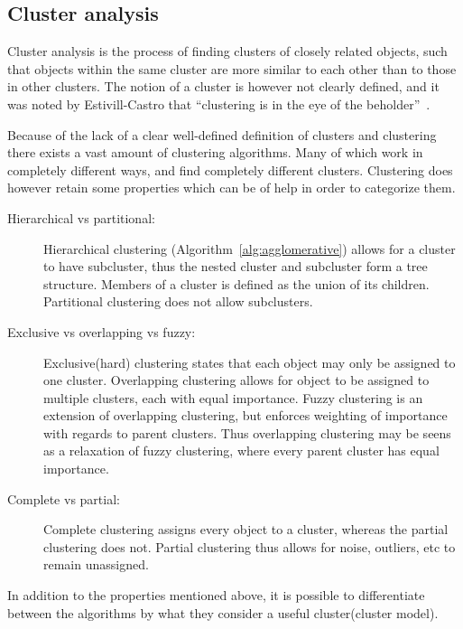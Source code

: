 \subsection{Cluster analysis}
Cluster analysis is the process of finding clusters of closely related objects, such that objects within the same cluster are more similar to each other than to those in other clusters. 
The notion of a cluster is however not clearly defined, and it was noted by Estivill-Castro that "`clustering is in the eye of the beholder"'~\cite{estivill2002so}.

\bigskip\noindent
Because of the lack of a clear well-defined definition of clusters and clustering there exists a vast amount of clustering algorithms. 
Many of which work in completely different ways, and find completely different clusters. 
Clustering does however retain some properties which can be of help in order to categorize them. 

\begin{description}
	\item[Hierarchical vs partitional:] Hierarchical clustering (Algorithm~\ref{alg:agglomerative}) allows for a cluster to have subcluster, thus the nested cluster and subcluster form a tree structure. Members of a cluster is defined as the union of its children. Partitional clustering does not allow subclusters. 
	\item[Exclusive vs overlapping vs fuzzy:] Exclusive(hard) clustering states that each object may only be assigned to one cluster. Overlapping clustering allows for object to be assigned to multiple clusters, each with equal importance. Fuzzy clustering is an extension of overlapping clustering, but enforces weighting of importance with regards to parent clusters. Thus overlapping clustering may be seens as a relaxation of fuzzy clustering, where every parent cluster has equal importance.
	\item[Complete vs partial:] Complete clustering assigns every object to a cluster, whereas the partial clustering does not. Partial clustering thus allows for noise, outliers, etc to remain unassigned.
\end{description}

\bigskip\noindent
In addition to the properties mentioned above, it is possible to 
differentiate between the algorithms by what they consider a useful cluster(cluster model). 

